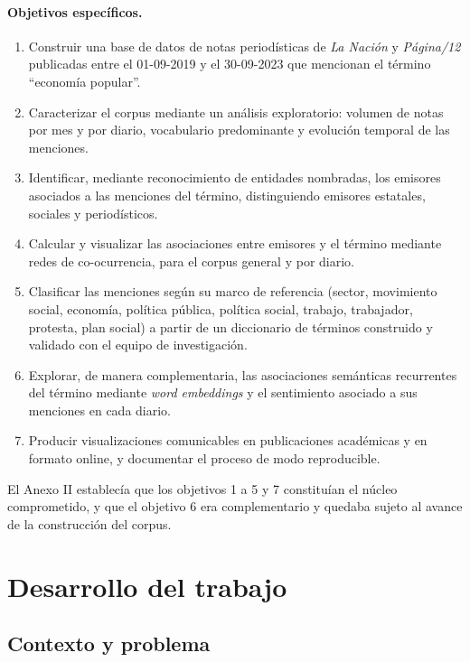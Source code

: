 \documentclass[11pt,a4paper]{article}
\newcommand{\pdoce}{\textit{Página/12}}
\newcommand{\lanac}{\textit{La Nación}}
\newcommand{\EP}{economía popular}
\begin{document}
\paragraph{Objetivos específicos.}
\begin{enumerate}
  \item Construir una base de datos de notas periodísticas de \lanac{} y \pdoce{} publicadas entre el 01-09-2019 y el 30-09-2023 que mencionan el término \enquote{\EP}.
  \item Caracterizar el corpus mediante un análisis exploratorio: volumen de notas por mes y por diario, vocabulario predominante y evolución temporal de las menciones.
  \item Identificar, mediante reconocimiento de entidades nombradas, los emisores asociados a las menciones del término, distinguiendo emisores estatales, sociales y periodísticos.
  \item Calcular y visualizar las asociaciones entre emisores y el término mediante redes de co-ocurrencia, para el corpus general y por diario.
  \item Clasificar las menciones según su marco de referencia (sector, movimiento social, economía, política pública, política social, trabajo, trabajador, protesta, plan social) a partir de un diccionario de términos construido y validado con el equipo de investigación.
  \item Explorar, de manera complementaria, las asociaciones semánticas recurrentes del término mediante \textit{word embeddings} y el sentimiento asociado a sus menciones en cada diario.
  \item Producir visualizaciones comunicables en publicaciones académicas y en formato online, y documentar el proceso de modo reproducible.
\end{enumerate}

El Anexo II establecía que los objetivos 1 a 5 y 7 constituían el núcleo comprometido, y que el objetivo 6 era complementario y quedaba sujeto al avance de la construcción del corpus.

\section{Desarrollo del trabajo}

\subsection{Contexto y problema}
\end{document}
